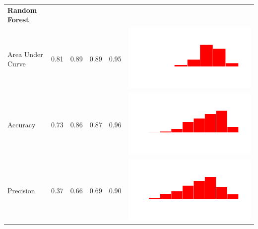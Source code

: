 \documentclass[conference]{IEEEtran}
\begin{document}
\begin{table}
\begin{tabular}{lrrrrc}
    \bf{Random Forest}\\
    Area Under Curve & 0.81 & 0.89 & 0.89 & 0.95 & \includegraphics[scale = 0.1, clip = true, trim= 50px 60px 50px 60px]{../figs/hist-results/hist-RFauc.pdf} \\
    Accuracy & 0.73 & 0.86 & 0.87 & 0.96 & \includegraphics[scale = 0.1, clip = true, trim= 50px 60px 50px 60px]{../figs/hist-results/hist-RFacc.pdf} \\
    Precision & 0.37 & 0.66 & 0.69 & 0.90 & \includegraphics[scale = 0.1, clip = true, trim= 50px 60px 50px 60px]{../figs/hist-results/hist-RFprec.pdf} \\

\end{tabular}
\end{table}
\end{document}
